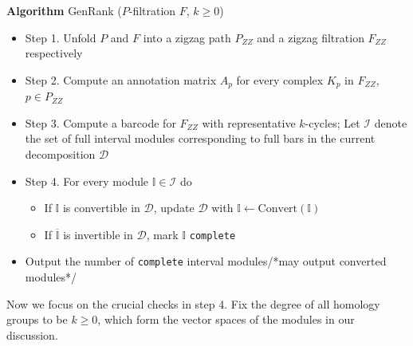 \documentclass[11pt]{article}
\theoremstyle{plain}%
\newcommand{\Int}{\mathbb{I}}
\newcommand{\D}{\mathcal{D}}
\begin{document}
\noindent
{\bf Algorithm} {\sc GenRank} ($P$-filtration $F$, $k\geq 0$)\label{algorithm:GenRank}
\begin{itemize}
    \item Step 1. Unfold $P$ and $F$ into a zigzag path $P_{ZZ}$ and a
    zigzag filtration $F_{ZZ}$ respectively
    \item Step 2. Compute an annotation matrix $A_p$ for every complex $K_p$ in $F_{ZZ}$, $p\in P_{ZZ}$
    \item Step 3. Compute a barcode for $F_{ZZ}$ with representative $k$-cycles; Let $\mathcal I$ denote the set of full interval modules  corresponding to full bars in the current decomposition $\D$
    \item Step 4. For every module $\Int\in {\mathcal I}$ do
        \begin{itemize}
           \item If $\Int$ is convertible in $\D$, update $\D$ with $\Int\leftarrow\mathrm{Convert}(\Int)$
        \item If $\overline{\Int}$ is invertible in $\D$, mark $\Int$ \texttt{complete} 
        \end{itemize}       
    \item Output the number of \texttt{complete} interval modules/*may output converted modules*/
\end{itemize}

Now we focus on the crucial checks in step 4. Fix the degree of all homology groups
to be $k\geq 0$, which form the vector spaces of the modules in our discussion.
\end{document}
